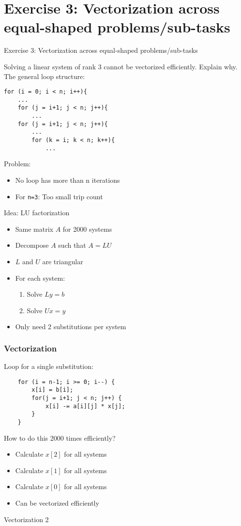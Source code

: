 \section{Exercise 3: Vectorization across equal-shaped problems/sub-tasks}

\begin{frame}{}
\begin{center}
{\Huge Exercise 3: Vectorization across equal-shaped problems/sub-tasks}
\end{center}
\end{frame}

\begin{frame}[fragile]{Solving a linear system of rank 3 cannot be vectorized efficiently. Explain why.}
The general loop structure:
\codestylec
\begin{lstlisting}
for (i = 0; i < n; i++){
    ...
    for (j = i+1; j < n; j++){
        ...
    for (j = i+1; j < n; j++){
        ...
        for (k = i; k < n; k++){
            ...                   
\end{lstlisting}
Problem:
\begin{itemize}
\item No loop has more than n iterations
\item For \texttt{n=3}: Too small trip count
\end{itemize}
\end{frame}

\begin{frame}{Idea: LU factorization}
\begin{itemize}
\item Same matrix $A$ for 2000 systems
\item Decompose $A$ such that $A = LU$
\item $L$ and $U$ are triangular
\break
\item For each system:
	\begin{enumerate}
	\item Solve $Ly = b$
	\item Solve $Ux = y$
	\end{enumerate}
\item Only need 2 substitutions per system
\end{itemize}
\end{frame}

\begin{frame}[fragile]
\frametitle{Vectorization}
Loop for a single substitution:
\codestylec
\begin{lstlisting}
    for (i = n-1; i >= 0; i--) {
        x[i] = b[i];
        for(j = i+1; j < n; j++) {
            x[i] -= a[i][j] * x[j];
        }
    }                  
\end{lstlisting}
How to do this 2000 times efficiently?
\begin{itemize}
\item Calculate $x[2]$ for all systems
\item Calculate $x[1]$ for all systems
\item Calculate $x[0]$ for all systems
\item Can be vectorized efficiently
\end{itemize}
\end{frame}

\begin{frame}{Vectorization 2}
\end{frame}
